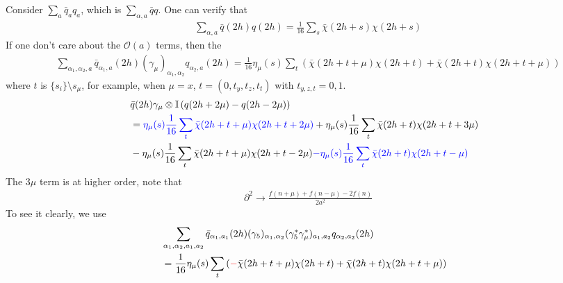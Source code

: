Consider $\sum _a \bar{q}_aq_a$, which is $\sum _{\alpha,a} \bar{q}q$. One can verify that
\begin{equation}
\begin{split}
&\sum _{\alpha,a} \bar{q}(2h)q(2h) = \frac{1}{16}\sum _s \bar{\chi}(2h+s)\chi (2h+s)
\end{split}
\end{equation}
If one don't care about the $\mathcal{O}(a)$ terms, then the
\textcolor[rgb]{0,0.5,0}{
\begin{equation}
\begin{split}
&\sum _{\alpha_1,\alpha _2,a} \bar{q}_{\alpha_1,a}(2h)(\gamma _{\mu})_{\alpha_1,\alpha_2} q_{\alpha _2,a}(2h) = \frac{1}{16} \eta _{\mu}(s)\sum _{t} \left(\bar{\chi}(2h+t+\mu)\chi (2h+t) +  \bar{\chi}(2h+t)\chi (2h+t+\mu)\right)
\end{split}
\end{equation}}
where $t$ is $\{s_{i}\}\setminus s_{\mu}$, for example, when $\mu=x$, $t=(0,t_y,t_z,t_t)$ with $t_{y,z,t}=0,1$.
\begin{equation}
\begin{split}
&\bar{q}(2h)\gamma _{\mu}\otimes \mathbb{I} \left(q(2h+2\mu)-q(2h-2\mu)\right) \\
&=\textcolor[rgb]{0,0,1}{\eta _{\mu}(s)\frac{1}{16}\sum _{t} \bar{\chi}(2h+t+\mu)\chi (2h+t+2\mu)} + \eta _{\mu}(s)\frac{1}{16}\sum _{t} \bar{\chi}(2h+t)\chi (2h+t+3\mu)\\
&-\eta _{\mu}(s)\frac{1}{16}\sum _{t} \bar{\chi}(2h+t+\mu)\chi (2h+t-2\mu) \textcolor[rgb]{0,0,1}{- \eta_{\mu} (s)\frac{1}{16}\sum _{t} \bar{\chi}(2h+t)\chi (2h+t-\mu)}
\end{split}
\end{equation}
The $3\mu$ term is at higher order, note that
\begin{equation}
\begin{split}
&\partial ^2 \to \frac{f(n+\mu)+f(n-\mu)-2f(n)}{2a^2}
\end{split}
\end{equation}
To see it clearly, we use
\begin{equation}
\begin{split}
&\sum _{\alpha_1,\alpha _2,a_1,a_2} \bar{q}_{\alpha_1,a_1}(2h)(\gamma _5)_{\alpha_1,\alpha_2} (\gamma _5^*\gamma _{\mu}^*)_{a_1,a_2}q_{\alpha _2,a_2}(2h) \\
&= \frac{1}{16} \eta _{\mu}(s)\sum _{t} \left(\textcolor[rgb]{1,0,0}{-}\bar{\chi}(2h+t+\mu)\chi (2h+t) +  \bar{\chi}(2h+t)\chi (2h+t+\mu)\right)
\end{split}
\label{eq.staggeredquark1}
\end{equation}
